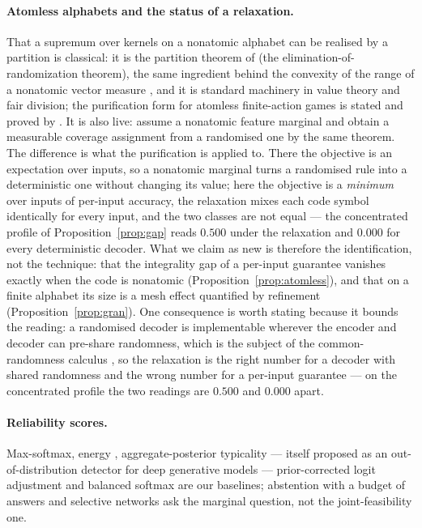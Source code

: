 \documentclass[11pt]{article}
\begin{document}
\paragraph{Atomless alphabets and the status of a relaxation.} That a supremum over kernels on a
nonatomic alphabet can be realised by a partition is classical: it is the partition theorem of
\citet{dvoretzky1951} (the elimination-of-randomization theorem), the same ingredient behind the
convexity of the range of a nonatomic vector measure \citep{lyapunov1940}, and it is standard
machinery in value theory and fair division; the purification form for atomless finite-action games
is stated and proved by
\citet{khan2006dwww}. It is also live: \citet{wang2026predict} assume a nonatomic feature marginal and obtain a
measurable coverage assignment from a randomised one by the same theorem. The difference is what the
purification is applied to. There the objective is an expectation over inputs, so a nonatomic marginal
turns a randomised rule into a deterministic one without changing its value; here the objective is a
\emph{minimum} over inputs of per-input accuracy, the relaxation mixes each code symbol identically for
every input, and the two classes are not equal --- the concentrated profile of
Proposition~\ref{prop:gap} reads $0.500$ under the relaxation and $0.000$ for every deterministic
decoder. What we claim as new is therefore the identification, not the technique: that the integrality
gap of a per-input guarantee vanishes exactly when the code is nonatomic
(Proposition~\ref{prop:atomless}), and that on a finite alphabet its size is a mesh effect quantified by
refinement (Proposition~\ref{prop:gran}). One consequence is worth stating because it bounds the reading:
a randomised decoder is implementable wherever the encoder and decoder can pre-share randomness, which is
the subject of the common-randomness calculus \citep{ahlswede1993cr}, so the relaxation is the right
number for a decoder with shared randomness and the wrong number for a per-input guarantee --- on the
concentrated profile the two readings are $0.500$ and $0.000$ apart.
\paragraph{Reliability scores.} Max-softmax, energy \citep{liu2020energy}, aggregate-posterior
typicality \citep{typicality2019,vnduqe2026} --- itself proposed as an out-of-distribution detector
for deep generative models \citep{nalisnick2019} --- prior-corrected logit adjustment
\citep{menon2021} and balanced softmax \citep{balanced2020} are our baselines; abstention with a
budget of answers
\citep{geifman2017selective,kalai2021} and selective networks \citep{geifman2019selectivenet}
ask the marginal question, not the joint-feasibility one.
\end{document}
